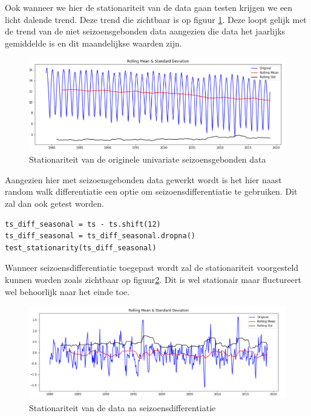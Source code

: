 Ook wanneer we hier de stationariteit van de data gaan testen krijgen we een licht dalende trend. Deze trend die zichtbaar is op figuur \ref{fig:uvsstationarity}. Deze loopt gelijk met de trend van de niet seizoensgebonden data aangezien die data het jaarlijks gemiddelde is en dit maandelijkse waarden zijn.

\begin{figure}
    \centering
    \caption{Stationariteit van de originele univariate seizoensgebonden data}
    \label{fig:uvsstationarity}
    \includegraphics[width=1\linewidth]{uvsstationarity}
\end{figure}

Aangezien hier met seizoensgebonden data gewerkt wordt is het hier naast random walk differentiatie een optie om seizoensdifferentiatie te gebruiken. Dit zal dan ook getest worden. 

\begin{verbatim}
ts_diff_seasonal = ts - ts.shift(12)
ts_diff_seasonal = ts_diff_seasonal.dropna()
test_stationarity(ts_diff_seasonal)
\end{verbatim}

Wanneer seizoensdifferentiatie toegepast wordt zal de stationariteit voorgesteld kunnen worden zoals zichtbaar op figuur\ref{fig:uvsstationarityseasonal}. Dit is wel stationair maar fluctureert wel behoorlijk naar het einde toe.

\begin{figure}
    \centering
    \caption{Stationariteit van de data na seizoensdifferentiatie}
    \label{fig:uvsstationarityseasonal}
    \includegraphics[width=1\linewidth]{uvsstationarityseasonal}
\end{figure}

